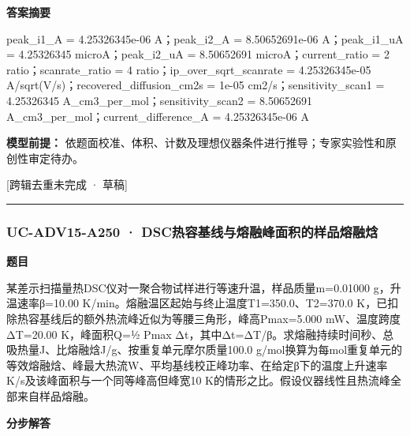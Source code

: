\documentclass[UTF8,11pt,a4paper]{ctexart}
\begin{document}
\noindent\textbf{答案摘要}\par
peak\_i1\_A = 4.25326345e-06 A；peak\_i2\_A = 8.50652691e-06 A；peak\_i1\_uA = 4.25326345 microA；peak\_i2\_uA = 8.50652691 microA；current\_ratio = 2 ratio；scanrate\_ratio = 4 ratio；ip\_over\_sqrt\_scanrate = 4.25326345e-05 A/sqrt(V/s)；recovered\_diffusion\_cm2s = 1e-05 cm2/s；sensitivity\_scan1 = 4.25326345 A\_cm3\_per\_mol；sensitivity\_scan2 = 8.50652691 A\_cm3\_per\_mol；current\_difference\_A = 4.25326345e-06 A\par
\noindent\textbf{模型前提：}
依题面校准、体积、计数及理想仪器条件进行推导；专家实验性和原创性审定待办。\par
\noindent\textcolor{red!65!black}{[跨辑去重未完成 · 草稿]} \par
\medskip\hrule\medskip
{}
\subsubsection*{UC-ADV15-A250 · DSC热容基线与熔融峰面积的样品熔融焓}
\noindent\textbf{题目}\par
某差示扫描量热DSC仪对一聚合物试样进行等速升温，样品质量m=0.01000 g，升温速率β=10.00 K/min。熔融温区起始与终止温度T1=350.0、T2=370.0 K，已扣除热容基线后的额外热流峰近似为等腰三角形，峰高Pmax=5.000 mW、温度跨度ΔT=20.00 K，峰面积Q=½ Pmax Δt，其中Δt=ΔT/β。求熔融持续时间秒、总吸热量J、比熔融焓J/g、按重复单元摩尔质量100.0 g/mol换算为每mol重复单元的等效熔融焓、峰最大热流W、平均基线校正峰功率、在给定β下的温度上升速率K/s及该峰面积与一个同等峰高但峰宽10 K的情形之比。假设仪器线性且热流峰全部来自样品熔融。\par
\medskip\noindent\textbf{分步解答}
\end{document}
